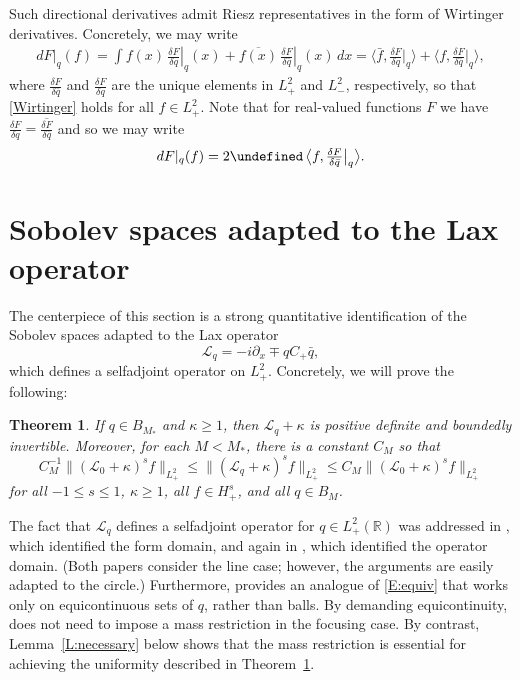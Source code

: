 \documentclass{amsart}
\numberwithin{equation}{section}
\newtheorem{theorem}{Theorem}[section]
\theoremstyle{definition}
\newcommand{\dl}{\delta}
\newcommand{\ka}{\kappa}
\newcommand{\R}{\mathbb{R}}
\newcommand{\Lc}{\mathcal{L}}
\newcommand{\f}{\frac}
\newcommand{\dd}{\partial}
\newcommand{\lan}{\langle}
\newcommand{\ran}{\rangle}
\let\Re=\undefined\DeclareMathOperator{\Re}{Re}
\begin{document}
Such directional derivatives admit Riesz representatives in the form of Wirtinger derivatives.  Concretely, we may write
\begin{align}\label{Wirtinger}
d F|_q(f)=\int f(x)\,\left.\f{\dl F}{\dl q}\right|_q(x)+\overline{f(x)}\,{\left.\f{\dl F}{\dl \bar{q}}\right|_q}(x)\,dx= \bigl\langle \bar f,\tfrac{\dl F}{\dl q}\bigr|_q \bigr\rangle +  \bigl\langle f, \tfrac{\dl F}{\dl \bar q}\bigr|_q\bigr\rangle,
\end{align}
where $\f{\dl F}{\dl\bar{q}}$ and $\f{\dl F}{\dl q}$ are the unique elements in $L^2_+$ and $L^2_-$, respectively, so that \eqref{Wirtinger} holds for all $f\in L^2_+$.  Note that for real-valued functions $F$ we have $\f{\dl F}{\dl{q}}=\overline{\f{\dl F}{\dl\bar{q}}}$ and so we may write
\begin{align}\label{1:51}
d F|_q(f)=2\Re\,\bigl\lan f,{\tfrac{\dl F}{\dl \bar{q}}\bigr|_q}\bigr\ran.
\end{align}


\section{Sobolev spaces adapted to the Lax operator}\label{S:3}


The centerpiece of this section is a strong quantitative identification of the Sobolev spaces adapted to the Lax operator
\begin{equation}\label{E:L in S2}
\Lc_q =-i\dd_x \mp qC_+\bar{q},
\end{equation}
which defines a selfadjoint operator on $L^2_+$. Concretely, we will prove the following:
 
\begin{theorem}\label{T:equiv}
If $q\in B_{M_*}$ and $\kappa\geq 1$, then $\Lc_q+\kappa$ is positive definite and boundedly invertible.  Moreover, for each $M< M_*$, there is a constant $C_M$ so that
\begin{equation}\label{E:equiv}
C_M^{-1}  \|(\Lc_0+\ka)^{s}f \|_{L^2_+} \leq \|(\Lc_q+\ka)^{s}f \|_{L^2_+}\leq C_M \|(\Lc_0+\ka)^{s}f \|_{L^2_+} 
\end{equation}
for all $-1\leq s\leq 1$, $\kappa\geq 1$, all $f\in H^s_+$, and all $q\in B_M$. 
\end{theorem}

The fact that $\Lc_q$ defines a selfadjoint operator for $q\in L^2_+(\R)$ was addressed in \cite{gerard2024calogero}, which identified the form domain, and again in \cite{killip2023scaling}, which identified the operator domain. (Both papers consider the line case; however, the arguments are easily adapted to the circle.)  Furthermore, \cite[Prop.~2.2]{killip2023scaling} provides an analogue of \eqref{E:equiv} that works only on equicontinuous sets of $q$, rather than balls.  By demanding equicontinuity, \cite{killip2023scaling} does not need to impose a mass restriction in the focusing case.  By contrast, Lemma~\ref{L:necessary} below shows that the mass restriction is essential for achieving the uniformity described in Theorem~\ref{T:equiv}.  
\end{document}
